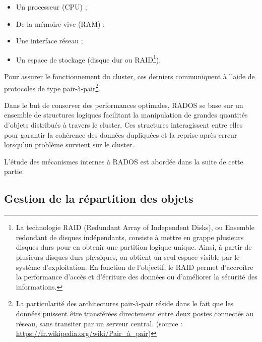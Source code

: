 \begin{itemize}
	\item Un processeur (CPU) ;
	\item De la mémoire vive (RAM) ;
    \item Une interface réseau ;
    \item Un espace de stockage (disque dur ou RAID\footnote{La technologie RAID (Redundant Array of Independent Disks), ou \og{}Ensemble redondant de disques indépendants\fg{}, consiste à mettre en grappe plusieurs disques durs pour en obtenir une partition logique unique. Ainsi, à partir de plusieurs disques durs physiques, on obtient un seul espace visible par le système d’exploitation. En fonction de l’objectif, le RAID permet d'accroître la performance d’accès et d’écriture des données ou d'améliorer la sécurité des informations.}).
\end{itemize}

Pour assurer le fonctionnement du cluster, ces derniers communiquent à l'aide de protocoles de type pair-à-pair\footnote{La particularité des architectures pair-à-pair réside dans le fait que les données puissent être transférées directement entre deux postes connectés au réseau, sans transiter par un serveur central. (source : \url{https://fr.wikipedia.org/wiki/Pair\_à\_pair})}. 

\begin{PimpedBox}
Dans le but de conserver des performances optimales, RADOS se base sur un ensemble de structures logiques facilitant la manipulation de grandes quantités d'objets distribués à travers le cluster. Ces structures interagissent entre elles pour garantir la cohérence des données dupliquées et la reprise après erreur lorsqu'un problème survient sur le cluster. 
\end{PimpedBox}

L'étude des mécanismes internes à RADOS est abordée dans la suite de cette partie.

\subsection{Gestion de la répartition des objets}

